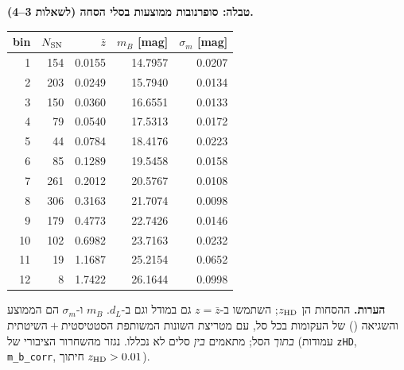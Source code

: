 \documentclass[11pt,a4paper]{article}
\begin{document}
\clearpage
\begin{center}
\textbf{טבלה: סופרנובות  ממוצעות בסלי הסחה (לשאלות 3--4).}\\[6pt]
\begin{otherlanguage}{english}
\begin{tabular}{rrrrr}
\toprule
bin & $N_{\rm SN}$ & $\bar z$ & $m_B$ [mag] & $\sigma_{m}$ [mag]\\
\midrule
1 & 154 & 0.0155 & 14.7957 & 0.0207 \\
2 & 203 & 0.0249 & 15.7940 & 0.0134 \\
3 & 150 & 0.0360 & 16.6551 & 0.0133 \\
4 & 79 & 0.0540 & 17.5313 & 0.0172 \\
5 & 44 & 0.0784 & 18.4176 & 0.0223 \\
6 & 85 & 0.1289 & 19.5458 & 0.0158 \\
7 & 261 & 0.2012 & 20.5767 & 0.0108 \\
8 & 306 & 0.3163 & 21.7074 & 0.0098 \\
9 & 179 & 0.4773 & 22.7426 & 0.0146 \\
10 & 102 & 0.6982 & 23.7163 & 0.0232 \\
11 & 19 & 1.1687 & 25.2154 & 0.0652 \\
12 & 8 & 1.7422 & 26.1644 & 0.0998 \\
\bottomrule
\end{tabular}
\end{otherlanguage}
\end{center}
{\small \textbf{הערות.} ההסחות הן $z_{\rm HD}$; השתמשו ב-$z=\bar z$ גם במודל וגם ב-$d_L$. $m_B$ ו-$\sigma_m$ הם הממוצע והשגיאה () של העקומות בכל סל, עם מטריצת השונות המשותפת הסטטיסטית${}+{}$השיטתית \emph{בתוך} הסל; מתאמים \emph{בין} סלים לא נכללו. נגזר מהשחרור הציבורי של  (עמודות \texttt{zHD}, \texttt{m\_b\_corr}, חיתוך $z_{\rm HD}>0.01$).}
\end{document}
